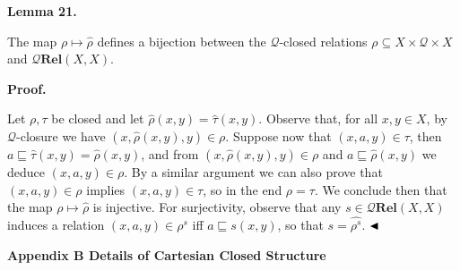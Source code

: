  
 
\par\medskip\noindent\textbf{Lemma 21.}\par
 
 
The map $\rho\mapsto\widehat{\rho}$ defines a bijection between the $\mathcal{Q}$-closed relations $\rho\subseteq X\times\mathcal{Q}\times X$ and $\mathcal{Q}\mathbf{Rel}(X,X)$.\par
 
 
 
 
 
\par\medskip\noindent\textbf{Proof.}\par
 
 
Let $\rho,\tau$ be closed and let $\widehat{\rho}(x,y)=\widehat{\tau}(x,y)$. Observe that, for all $x,y\in X$, by $\mathcal{Q}$-closure we have $(x,\widehat{\rho}(x,y),y)\in\rho$. Suppose now that $(x,a,y)\in\tau$, then $a\sqsubseteq\widehat{\tau}(x,y)=\widehat{\rho}(x,y)$, and from $(x,\widehat{\rho}(x,y),y)\in\rho$ and $a\sqsubseteq\widehat{\rho}(x,y)$ we deduce $(x,a,y)\in\rho$. By a similar argument we can also prove that $(x,a,y)\in\rho$ implies $(x,a,y)\in\tau$, so in the end $\rho=\tau$. We conclude then that the map $\rho\mapsto\widehat{\rho}$ is injective. For surjectivity, observe that any $s\in\mathcal{Q}\mathbf{Rel}(X,X)$ induces a relation $(x,a,y)\in\rho^{s}$ iff $a\sqsubseteq s(x,y)$, so that $s=\widehat{\rho^{s}}$. $\hfill\blacktriangleleft$\par
 
 
 


 
\par\medskip\noindent\textbf{Appendix B Details of Cartesian Closed Structure}\par
 
 
